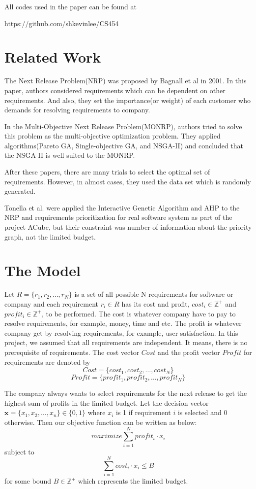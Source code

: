 All codes used in the paper can be found at 

https://github.com/shkevinlee/CS454

\section{Related Work}
The Next Release Problem(NRP)\cite{NRP} was proposed by Bagnall et al in 2001. In this paper, authors considered requirements which can be dependent on other requirements. And also, they set the importance(or weight) of each customer who demands for resolving requirements to company.

In the Multi-Objective Next Release Problem(MONRP)\cite{MONRP}, authors tried to solve this problem as the multi-objective optimization problem. They applied algorithms(Pareto GA, Single-objective GA, and NSGA-II) and concluded that the NSGA-II is well suited to the MONRP.

After these papers, there are many trials to select the optimal set of requirements.\cite{ILP} \cite{DE} \cite{ACO} However, in almost cases, they used the data set which is randomly generated.

Tonella et al. were applied the Interactive Genetic Algorithm and AHP to the NRP and requirements prioritization for real software system as part of the project ACube, but their constraint was number of information about the priority graph, not the limited budget.\cite{IGA} 



\section{The Model}

Let $R = \{r_1, r_2, \ldots, r_N\}$ is a set of all possible N requirements for software or company and each requirement $r_i \in R$ has its cost and profit, $cost_i \in \mathbb{Z}^+$ and $profit_i \in \mathbb{Z}^+$, to be performed. The cost is whatever company have to pay to resolve requirements, for example, money, time and etc. The profit is whatever company get by resolving requirements, for example, user satisfaction. In this project, we assumed that all requirements are independent. It means, there is no prerequisite of requirements. The cost vector $Cost$ and the profit vector $Profit$ for requirements are denoted by 
\[
Cost = \{cost_1, cost_2, \ldots, cost_N\}
\]
\[
Profit = \{profit_1, profit_2, \ldots, profit_N\}
\]

The company always wants to select requirements for the next release to get the highest sum of profits in the limited budget. Let the decision vector $\textbf{x} = \{x_1, x_2, \ldots, x_n\} \in \{0, 1\}$ where $x_i$ is 1 if requirement $i$ is selected and 0 otherwise. Then our objective function can be written as below:
\[
maximize \sum_{i = 1}^{N} profit_i \cdot x_i
\]
subject to
\[
\sum_{i = 1}^{N} cost_i \cdot x_i \leq B
\]
for some bound $B \in \mathbb{Z}^+$ which represents the limited budget.

